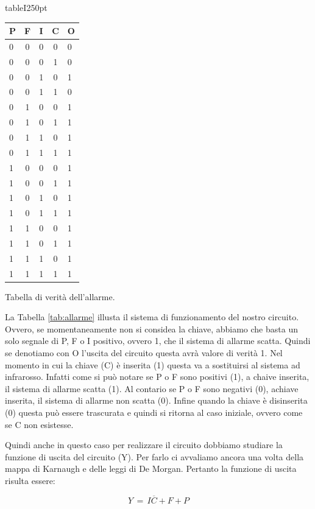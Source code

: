 \begin{wrapfloat}{table}{I}{250pt}
\centering
\begin{tabular}{l c c c | l}
	\toprule
		P & F & I & C & O \\
	\midrule
		0 & 0 & 0 & 0 & 0 \\
		0 & 0 & 0 & 1 & 0 \\
		0 & 0 & 1 & 0 & 1 \\
		0 & 0 & 1 & 1 & 0 \\
		0 & 1 & 0 & 0 & 1 \\
		0 & 1 & 0 & 1 & 1 \\
		0 & 1 & 1 & 0 & 1 \\
		0 & 1 & 1 & 1 & 1 \\
		1 & 0 & 0 & 0 & 1 \\
		1 & 0 & 0 & 1 & 1 \\
		1 & 0 & 1 & 0 & 1 \\
		1 & 0 & 1 & 1 & 1 \\
		1 & 1 & 0 & 0 & 1 \\
		1 & 1 & 0 & 1 & 1 \\
		1 & 1 & 1 & 0 & 1 \\
		1 & 1 & 1 & 1 & 1 \\
	\bottomrule
\end{tabular}
\caption{Tabella di verità dell'allarme.}
\label{tab:allarme}
\end{wrapfloat}

La Tabella \ref{tab:allarme} illusta il sistema di funzionamento del nostro circuito. Ovvero, se momentaneamente non si considea la chiave, abbiamo che basta un solo segnale di P, F o I positivo, ovvero 1, che il sistema di allarme scatta. Quindi se denotiamo con O l'uscita del circuito questa avrà valore di verità 1. Nel momento in cui la chiave (C) è inserita (1) questa va a sostituirsi al sistema ad infrarosso. Infatti come si può notare se P o F sono positivi (1), a chaive inserita, il sistema di allarme scatta (1). Al contario se P o F sono negativi (0), achiave inserita, il sistema di allarme non scatta (0). Infine quando la chiave è disinserita (0) questa può essere trascurata e quindi si ritorna al caso iniziale, ovvero come se C non esistesse.

Quindi anche in questo caso per realizzare il circuito dobbiamo studiare la funzione di uscita del circuito (Y). Per farlo ci avvaliamo ancora una volta della mappa di Karnaugh e delle leggi di De Morgan. Pertanto la funzione di uscita risulta essere:

\begin{equation*}
	Y\,=\,I\overline{C} + F + P
\end{equation*} 

